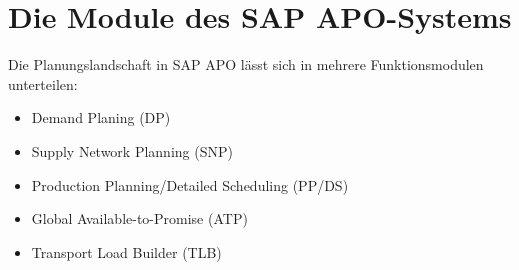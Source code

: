 \chapter{Die Module des SAP APO-Systems}
Die Planungslandschaft in SAP APO lässt sich in mehrere Funktionsmodulen unterteilen:
\begin{itemize}
	\item Demand Planing (DP)
	\item Supply Network Planning (SNP)
	\item Production Planning/Detailed Scheduling (PP/DS)
	\item Global Available-to-Promise (ATP)
	\item Transport Load Builder (TLB)
\end{itemize}